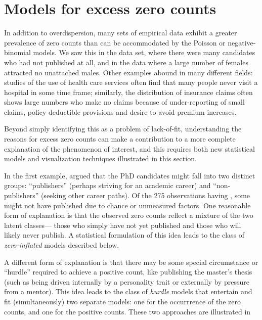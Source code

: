 \documentclass[11pt]{book}\usepackage[]{graphicx}\usepackage[]{color}
\begin{document}
\section{Models for excess zero counts}\label{sec:glm-zeros}


In addition to overdispersion, many sets of empirical data exhibit a greater prevalence of
zero counts than can be accommodated by the Poisson or negative-binomial models.
We saw this in the  data set, where there were many candidates who had
not published at all, and in the  data where a large number of
females attracted no unattached males.
Other examples abound in many different fields: studies of the 
use of health care services often find that many people never visit a hospital
in some time frame; similarly, the distribution of insurance claims often shows
large numbers who make no claims \citep{YipYau:2005} because of under-reporting
of small claims, policy deductible provisions and desire to avoid premium increases.


Beyond simply identifying this as a problem of lack-of-fit,
understanding the reasons for excess zero counts can make a contribution to a
more complete explanation of the phenomenon of interest,
and this requires both new statistical models and visualization techniques
illustrated in this section.

In the first example, \citet{Long:1997} argued that the PhD candidates might fall into
two distinct groups: ``publishers'' (perhaps striving for an academic career)
and ``non-publishers'' (seeking other career paths).  Of the 275 observations
having , some might not have published due to chance or
unmeasured factors.  One reasonable form of explanation is that the observed
zero counts reflect a mixture of the two latent classes--- those who simply
have not yet published and those who will likely never publish.
A statistical formulation of this idea leads to the class of \emph{zero-inflated}
models described below.

A different form of explanation is that there may be some special 
circumstance or ``hurdle'' required to achieve a positive count,
like publishing the master's thesis
(such as being driven internally by a personality trait or externally by
pressure from a mentor). This idea leads to the class of \emph{hurdle} models
that entertain and fit (simultaneously) two separate models: one for the
occurrrence of the zero counts, and one for the positive counts.
These two approaches are illustrated in 
\end{document}
